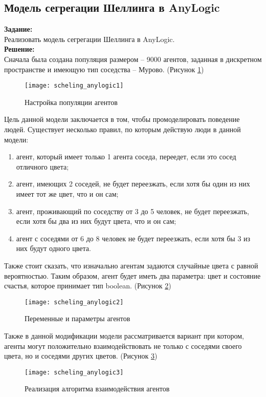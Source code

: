 \subsection*{Модель сегрегации Шеллинга в AnyLogic}

\textbf{Задание:}\\
Реализовать модель сегрегации Шеллинга в AnyLogic.\\

\textbf{Решение:}\\
Сначала была создана популяция размером -- 9000 агентов, заданная в дискретном пространстве и имеющую тип соседства -- Мурово. (Рисунок \ref{fig:scheling_anylogic1})
\begin{figure}[h]
	\centering \texttt{[image: scheling\_anylogic1]}
	\caption{Настройка популяции агентов}
	\label{fig:scheling_anylogic1}
\end{figure}

Цель данной модели заключается в том, чтобы промоделировать поведение людей. Существует несколько правил, по которым действую люди в данной модели:
\begin{enumerate}[topsep=0pt,itemsep=-1ex,partopsep=1ex,parsep=1ex]
	\item агент, который имеет только 1 агента соседа, переедет, если это сосед отличного цвета;
	\item агент, имеющих 2 соседей, не будет переезжать, если хотя бы один из них имеет тот же цвет, что и он сам;
	\item агент, проживающий по соседству от 3 до 5 человек, не будет переезжать, если хотя бы два из них будут цвета, что и он сам;
	\item агент с соседями от 6 до 8 человек не будет переезжать, если хотя бы 3 из них будут одного цвета.
\end{enumerate}

\newpage

Также стоит сказать, что изначально агентам задаются случайные цвета с равной вероятностью. Таким образом, агент будет иметь два параметра: цвет и состояние счастья, которое принимает тип boolean. (Рисунок \ref{fig:scheling_anylogic2})
\begin{figure}[h]
	\centering \texttt{[image: scheling\_anylogic2]}
	\caption{Переменные и параметры агентов}
	\label{fig:scheling_anylogic2}
\end{figure}

Также в данной модификации модели рассматривается вариант при котором, агенты могут положительно взаимодействовать не только с соседями своего цвета, но и соседями других цветов. (Рисунок \ref{fig:scheling_anylogic3})
\begin{figure}[h]
	\centering \texttt{[image: scheling\_anylogic3]}
	\caption{Реализация алгоритма взаимодействия агентов}
	\label{fig:scheling_anylogic3}
\end{figure}

